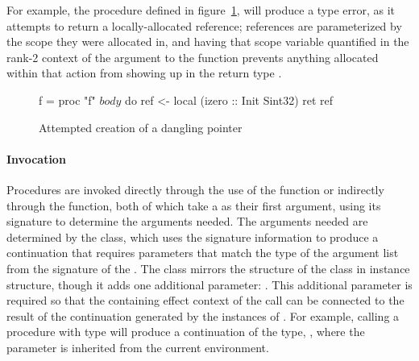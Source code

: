 For example, the procedure  defined in figure~\ref{fig:proc-def}, will
produce a type error, as it attempts to return a locally-allocated reference;
references are parameterized by the scope they were allocated in, and having
that scope variable quantified in the rank-2 context of the argument to the
 function prevents anything allocated within that action from showing
up in the return type .

\begin{figure}[h]
\begin{code}
f = proc "f" $ body $ do
  ref <- local (izero :: Init Sint32)
  ret ref
\end{code}
\caption{Attempted creation of a dangling pointer}
\label{fig:proc-def}
\end{figure}

\paragraph{Invocation} Procedures are invoked directly through the use of the
 function or indirectly through the  function, both of which
take a  as their first argument, using its signature to determine the
arguments needed.  The arguments needed are determined by the 
class, which uses the signature information to produce a continuation that
requires parameters that match the type of the argument list from the signature
of the .  The  class mirrors the structure of the
 class in instance structure, though it adds one additional
parameter: .  This additional parameter is required so that the
containing effect context of the call can be connected to the result of the
continuation generated by the instances of .  For example, calling
a procedure with type  will produce a
continuation of the type, , where the 
parameter is inherited from the current environment.


